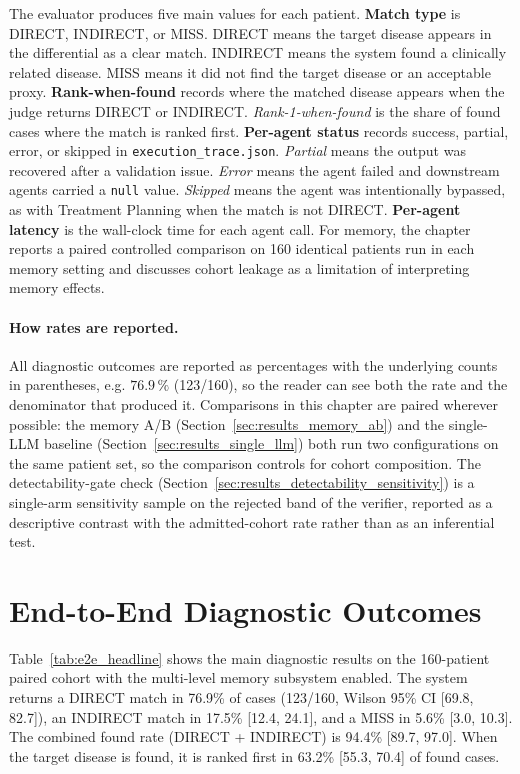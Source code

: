 The evaluator produces five main values for each patient. \textbf{Match type}
is DIRECT, INDIRECT, or MISS. DIRECT means the target disease appears in the
differential as a clear match. INDIRECT means the system found a clinically
related disease. MISS means it did not find the target disease or an acceptable
proxy. \textbf{Rank-when-found} records where the matched disease appears when
the judge returns DIRECT or INDIRECT. \emph{Rank-1-when-found} is the share of
found cases where the match is ranked first. \textbf{Per-agent status} records
success, partial, error, or skipped in \texttt{execution\_trace.json}.
\emph{Partial} means the output was recovered after a validation issue.
\emph{Error} means the agent failed and downstream agents carried a
\texttt{null} value. \emph{Skipped} means the agent was intentionally bypassed,
as with Treatment Planning when the match is not DIRECT. \textbf{Per-agent
latency} is the wall-clock time for each agent call. For memory, the chapter
reports a paired controlled comparison on 160 identical patients run in each memory
setting and discusses cohort leakage as a limitation of interpreting memory
effects.

\paragraph{How rates are reported.}
All diagnostic outcomes are reported as percentages with the
underlying counts in parentheses, e.g. $76.9\,\%$ (123/160), so the
reader can see both the rate and the denominator that produced it.
Comparisons in this chapter are paired wherever possible: the memory
A/B (Section~\ref{sec:results_memory_ab}) and the single-LLM baseline
(Section~\ref{sec:results_single_llm}) both run two configurations on
the same patient set, so the comparison controls for cohort
composition. The detectability-gate check
(Section~\ref{sec:results_detectability_sensitivity}) is a single-arm
sensitivity sample on the rejected band of the verifier, reported as
a descriptive contrast with the admitted-cohort rate rather than as
an inferential test.

\section{End-to-End Diagnostic Outcomes}
\label{sec:results_e2e}

Table~\ref{tab:e2e_headline} shows the main diagnostic results on the
160-patient paired cohort with the multi-level memory subsystem
enabled. The system returns a DIRECT match in 76.9\% of cases
(123/160, Wilson 95\% CI [69.8, 82.7]), an INDIRECT match in 17.5\%
[12.4, 24.1], and a MISS in 5.6\% [3.0, 10.3]. The combined found rate
(DIRECT + INDIRECT) is 94.4\% [89.7, 97.0]. When the target disease is
found, it is ranked first in 63.2\% [55.3, 70.4] of found cases.

